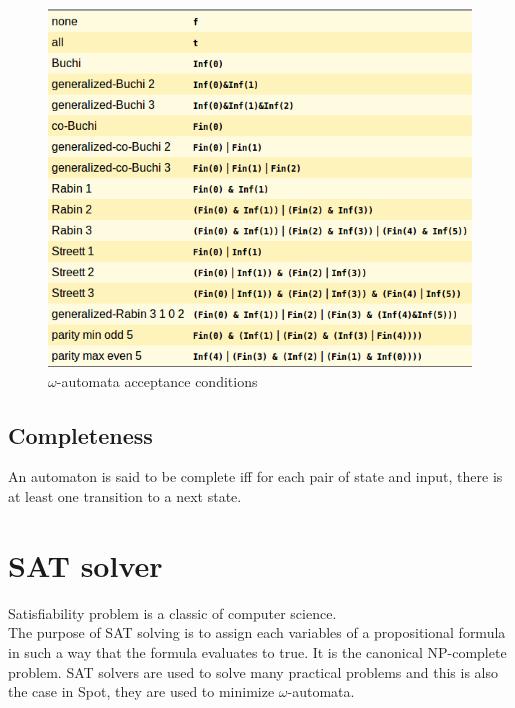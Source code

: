 \begin{figure}[H]
 \centering
 \includegraphics[scale=0.6]{img/acc_conds.png}
 \caption{$\omega$-automata acceptance conditions~\cite{8}}
 \label{fig:acc_conds}
\end{figure}

\subsection{Completeness}
An automaton is said to be complete iff for each pair of state and input, there is at least one transition
to a next state.

\section{SAT solver}
Satisfiability problem is a classic of computer science.\\

The purpose of SAT solving is to assign each variables of a propositional formula in such a way that the
formula evaluates to true. It is the canonical NP-complete problem. SAT solvers are used to solve many
practical problems and this is also the case in Spot, they are used to minimize $\omega$-automata.\\

